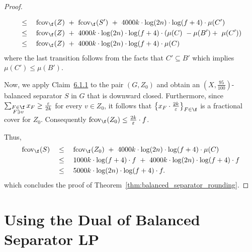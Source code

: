 \begin{proof}
\begin{claimproof}
\begin{align*}
            &\leq \quad \mathrm{fcov}_{\f}(Z)\ +\ \mathrm{fcov}_{\f}(S')\ +\ 4000k \cdot \log(2n) \cdot \log (f + 4) \cdot \mu(C') \\
            &\leq \quad \mathrm{fcov}_{\f}(Z)\ +\ 4000k \cdot \log(2n) \cdot \log (f + 4) \cdot \left(\mu(C)\ - \mu(B') +\ \mu(C')\right) \\
            &\leq \quad \mathrm{fcov}_{\f}(Z)\ +\ 4000k \cdot \log(2n) \cdot \log (f + 4) \cdot \mu(C)
        \end{align*}
        where the last transition follows from the facts that $C' \subseteq B'$ which implies $\mu(C') \leq \mu(B')$.
    \end{claimproof}
    Now, we apply Claim~\hyperref[claim:balanced_sep_cutoff_step]{6.1.1} to the pair $(G, Z_0)$ and obtain an $(X, \frac{95}{100})$-balanced separator $S$ in $G$ that is downward closed. Furthermore, since $\sum_{\substack{F\in\f\\ F\ni v}}x_F \geq \frac{\varepsilon}{2k}$ for every $v\in Z_0$, it follows that $\left\{x_F \cdot \frac{2k}{\varepsilon}\right\}_{F \in \f}$ is a fractional cover for $Z_0$. Consequently $\mathrm{fcov}_{\f}(Z_0) \leq \frac{2k}{\varepsilon} \cdot f$.

    Thus, 
    \begin{align*}
        \mathrm{fcov}_{\f}(S) \quad
        &\leq \quad \mathrm{fcov}_{\f}(Z_0)\ +\ 4000k \cdot \log(2n) \cdot \log (f + 4) \cdot \mu(C) \\
        &\leq \quad 1000k \cdot \log (f + 4) \cdot f\ +\ 4000k \cdot \log(2n) \cdot \log (f + 4) \cdot f \\
        &\leq \quad 5000k \cdot \log(2n) \cdot \log (f + 4) \cdot f.
    \end{align*}
    which concludes the proof of Theorem~\ref{thm:balanced_separator_rounding}.
\end{proof}

\section{Using the Dual of Balanced Separator LP}\label{sec:rounding_dual_balanced_sep}


